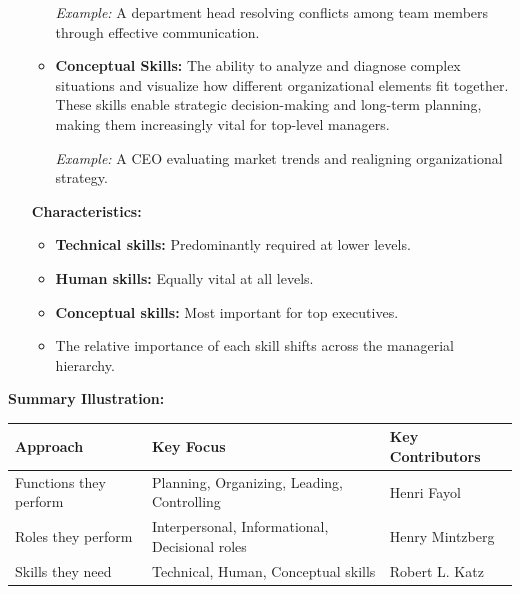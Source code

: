 \documentclass[10pt,a4paper]{book}
\begin{document}
\begin{multicols}{2}
\begin{enumerate}
\begin{itemize}
        \textit{Example:} A department head resolving conflicts among team members through effective communication.

        \item \textbf{Conceptual Skills:}
        The ability to analyze and diagnose complex situations and visualize how different organizational elements fit together. These skills enable strategic decision-making and long-term planning, making them increasingly vital for top-level managers.

        \textit{Example:} A CEO evaluating market trends and realigning organizational strategy.
    \end{itemize}

    \textbf{Characteristics:}
    \begin{itemize}
        \item \textbf{Technical skills:} Predominantly required at lower levels.
        \item \textbf{Human skills:} Equally vital at all levels.
        \item \textbf{Conceptual skills:} Most important for top executives.
        \item The relative importance of each skill shifts across the managerial hierarchy.
    \end{itemize}

\end{enumerate}

\end{multicols}

\textbf{Summary Illustration:}

\begin{tabular}{|p{5cm}|p{6.5cm}|p{5cm}|}
\hline
\textbf{Approach} & \textbf{Key Focus} & \textbf{Key Contributors} \\
\hline
Functions they perform & Planning, Organizing, Leading, Controlling & Henri Fayol \\
\hline
Roles they perform & Interpersonal, Informational, Decisional roles & Henry Mintzberg \\
\hline
Skills they need & Technical, Human, Conceptual skills & Robert L. Katz \\
\hline
\end{tabular}
\end{document}
